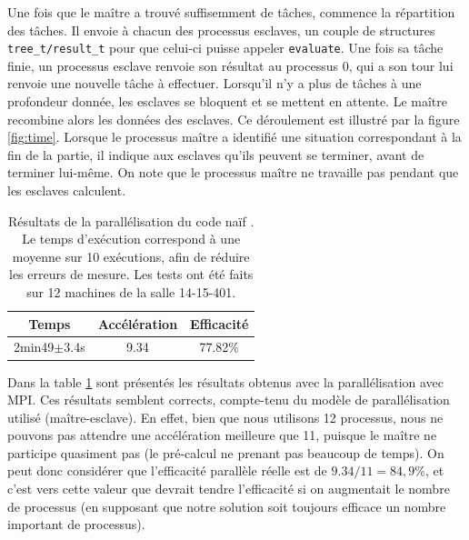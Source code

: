 \documentclass[12pt]{article}
\begin{document}
    \par Une fois que le maître a trouvé suffisemment de tâches, commence la
    répartition des tâches. Il envoie à chacun des processus esclaves, un
    couple de structures \texttt{tree\_t/result\_t} pour que celui-ci puisse
    appeler \texttt{evaluate}. Une fois sa tâche finie, un processus esclave 
    renvoie son résultat au processus 0, qui a son tour lui renvoie une
    nouvelle tâche à effectuer. Lorsqu'il n'y a plus de tâches à une profondeur
    donnée, les esclaves se bloquent et se mettent en attente. Le maître
    recombine alors les données des esclaves. Ce déroulement est illustré par
    la figure \ref{fig:time}. Lorsque le processus maître a identifié une
    situation correspondant à la fin de la partie, il indique aux esclaves
    qu'ils peuvent se terminer, avant de terminer lui-même.
    On note que le processus maître ne travaille pas pendant que les esclaves
    calculent.\\
    \begin{table} \begin{center}
        \begin{tabular}{|c|c|c|}
            \hline
            \textbf{Temps}      &   \textbf{Accélération}   &   \textbf{Efficacité} \\ \hline
            2min49$\pm$3.4s      &   9.34                   &   77.82\% \\ \hline
        \end{tabular}
        \caption{\label{tab:mpi1}Résultats de la parallélisation du code \og naïf \fg. Le temps
        d'exécution correspond à une moyenne sur 10 exécutions, afin de réduire les erreurs de
        mesure. Les tests ont été faits sur 12 machines de la salle 14-15-401.}
    \end{center} \end{table}
    \par Dans la table \ref{tab:mpi1} sont présentés les résultats obtenus avec
    la parallélisation avec MPI. Ces résultats semblent corrects, compte-tenu
    du modèle de parallélisation utilisé (maître-esclave). En effet, bien que nous 
    utilisons 12 processus, nous ne pouvons pas attendre une accélération meilleure que 11,
    puisque le maître ne participe quasiment pas (le pré-calcul ne prenant pas beaucoup de temps).
    On peut donc considérer que l'efficacité parallèle réelle est de $9.34/11 = 84,9\%$, 
    et c'est vers cette valeur que devrait tendre l'efficacité si on augmentait
    le nombre de processus (en supposant que notre solution soit toujours
    efficace un nombre important de processus).
\end{document}
